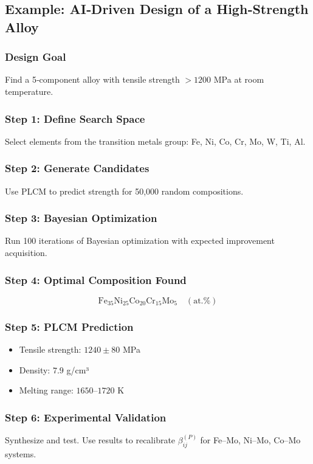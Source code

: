 \documentclass[12pt,a4paper]{article}
\begin{document}
	\subsection{Example: AI‑Driven Design of a High‑Strength Alloy}
	
	\subsubsection{Design Goal}
	Find a 5‑component alloy with tensile strength \(> 1200\) MPa at room temperature.
	
	\subsubsection{Step 1: Define Search Space}
	Select elements from the transition metals group: Fe, Ni, Co, Cr, Mo, W, Ti, Al.
	
	\subsubsection{Step 2: Generate Candidates}
	Use PLCM to predict strength for 50,000 random compositions.
	
	\subsubsection{Step 3: Bayesian Optimization}
	Run 100 iterations of Bayesian optimization with expected improvement acquisition.
	
	\subsubsection{Step 4: Optimal Composition Found}
	\[
	\text{Fe}_{35}\text{Ni}_{25}\text{Co}_{20}\text{Cr}_{15}\text{Mo}_{5} \quad (\text{at.}\%)
	\]
	
	\subsubsection{Step 5: PLCM Prediction}
	\begin{itemize}
		\item Tensile strength: \(1240 \pm 80\) MPa
		\item Density: \(7.9\) g/cm³
		\item Melting range: \(1650\)–\(1720\) K
	\end{itemize}
	
	\subsubsection{Step 6: Experimental Validation}
	Synthesize and test. Use results to recalibrate \(\beta_{ij}^{(P)}\) for Fe–Mo, Ni–Mo, Co–Mo systems.
	
\end{document}
